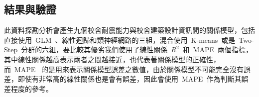 \subsection{結果與驗證}

此資料探勘分析會產生九個校舍耐震能力與校舍建築設計資訊間的關係模型，包括直接使用~GLM~、線性迴歸和類神經網路的三組，混合使用~K-means~或是~Two-Step~分群的六組，要比較其優劣我們使用了線性關係~$R^2$~和~MAPE~兩個指標，其中線性關係越高表示兩者之間越接近，也代表著關係模型的正確性，而~MAPE~ 的是用來表示關係模型誤差之數值，由於關係模型不可能完全沒有誤差，即使有非常高的線性關係也是會有誤差，因此會使用~MAPE~作為判斷其誤差程度的參考。








